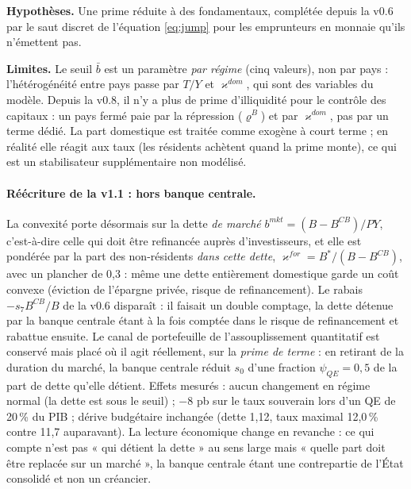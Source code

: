 \documentclass[11pt,a4paper]{article}
\newcommand{\hyp}{\par\noindent\textbf{Hypothèses.} }
\newcommand{\limites}{\par\noindent\textbf{Limites.} }
\begin{document}
\begin{lecture}
\hyp Une prime réduite à des fondamentaux, complétée depuis la v0.6 par le saut discret de l'équation \eqref{eq:jump} pour les emprunteurs en monnaie qu'ils n'émettent pas.
\limites Le seuil $\bar b$ est un paramètre \emph{par régime} (cinq valeurs), non par pays : l'hétérogénéité entre pays passe par $T/Y$ et $\varkappa^{dom}$, qui sont des variables du modèle. Depuis la v0.8, il n'y a plus de prime d'illiquidité pour le contrôle des capitaux : un pays fermé paie par la répression ($\varrho^B$) et par $\varkappa^{dom}$, pas par un terme dédié. La part domestique est traitée comme exogène à court terme ; en réalité elle réagit aux taux (les résidents achètent quand la prime monte), ce qui est un stabilisateur supplémentaire non modélisé.
\paragraph{Réécriture de la v1.1 : hors banque centrale.} La convexité porte désormais sur la dette \emph{de marché} $b^{mkt}=(B-B^{CB})/PY$, c'est-à-dire celle qui doit être refinancée auprès d'investisseurs, et elle est pondérée par la part des non-résidents \emph{dans cette dette}, $\varkappa^{for}=B^\ast/(B-B^{CB})$, avec un plancher de 0,3 : même une dette entièrement domestique garde un coût convexe (éviction de l'épargne privée, risque de refinancement). Le rabais $-s_7B^{CB}/B$ de la v0.6 disparaît : il faisait un double comptage, la dette détenue par la banque centrale étant à la fois comptée dans le risque de refinancement et rabattue ensuite. Le canal de portefeuille de l'assouplissement quantitatif est conservé mais placé où il agit réellement, sur la \emph{prime de terme} : en retirant de la duration du marché, la banque centrale réduit $s_0$ d'une fraction $\psi_{QE}=0{,}5$ de la part de dette qu'elle détient. Effets mesurés : aucun changement en régime normal (la dette est sous le seuil) ; $-8$ pb sur le taux souverain lors d'un QE de 20\,\% du PIB ; dérive budgétaire inchangée (dette 1,12, taux maximal 12,0\,\% contre 11,7 auparavant). La lecture économique change en revanche : ce qui compte n'est pas « qui détient la dette » au sens large mais « quelle part doit être replacée sur un marché », la banque centrale étant une contrepartie de l'État consolidé et non un créancier.

\end{lecture}
\end{document}
